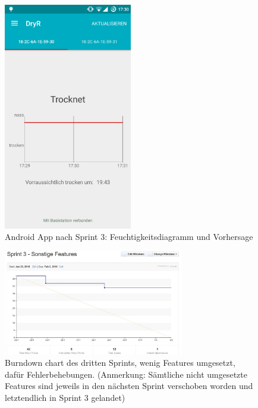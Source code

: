 \begin{figure}[htb] 
	\centerline{\includegraphics[width=0.5\textwidth]{laundry_status_diagram_forecast.png}}
	\caption{Android App nach Sprint 3: Feuchtigkeitsdiagramm und Vorhersage}
	\label{screenshot_sprint_3_laundry_status}
\end{figure}
\begin{figure}[htb] 
	\centerline{\includegraphics[width=0.7\textwidth]{burndown_sprint3.jpg}}
	\caption{Burndown chart des dritten Sprints, wenig Features umgesetzt, dafür Fehlerbehebungen. (Anmerkung: Sämtliche nicht umgesetzte Features sind jeweils in den nächsten Sprint verschoben worden und letztendlich in Sprint 3 gelandet)}
	\label{screenshot_sprint_3_burndown}
\end{figure}
